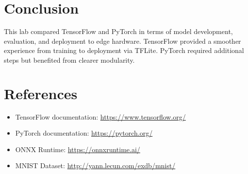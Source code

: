 \documentclass[a4paper,12pt]{article}
\begin{document}
\section{Conclusion}
This lab compared TensorFlow and PyTorch in terms of model development, evaluation, and deployment to edge hardware. TensorFlow provided a smoother experience from training to deployment via TFLite. PyTorch required additional steps but benefited from clearer modularity.

\section{References}
\begin{itemize}
    \item TensorFlow documentation: \url{https://www.tensorflow.org/}
    \item PyTorch documentation: \url{https://pytorch.org/}
    \item ONNX Runtime: \url{https://onnxruntime.ai/}
    \item MNIST Dataset: \url{http://yann.lecun.com/exdb/mnist/}
\end{itemize}
\end{document}
